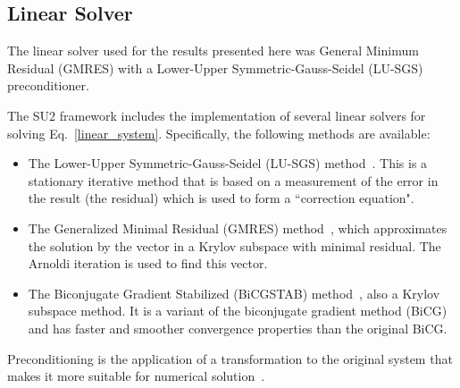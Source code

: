 
\subsection*{Linear Solver}
The linear solver used for the results presented here was General Minimum Residual (GMRES) with a Lower-Upper Symmetric-Gauss-Seidel (LU-SGS) preconditioner. 



The SU2 framework includes the implementation of several linear solvers for solving Eq.~\ref{linear_system}. Specifically, the following methods are available:
\begin{itemize}
\item The Lower-Upper Symmetric-Gauss-Seidel (LU-SGS) method~\cite{yoon88, jameson81b, jameson87}. This is a stationary iterative method that is based on a measurement of the error in the result (the residual) which is used to form a ``correction equation".
\item The Generalized Minimal Residual (GMRES) method~\cite{saad1986}, which approximates the solution by the vector in a Krylov subspace with minimal residual. The Arnoldi iteration is used to find this vector.
\item The Biconjugate Gradient Stabilized  (BiCGSTAB) method~\cite{Vorst1992}, also a Krylov subspace method. It is a variant of the biconjugate gradient method (BiCG) and has faster and smoother convergence properties than the original BiCG.
\end{itemize}

Preconditioning is the application of a transformation to the original system that makes it more suitable for numerical solution~\cite{pierce-1997}.